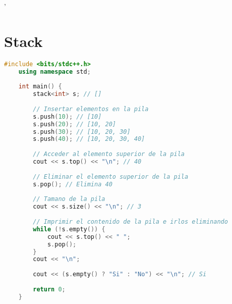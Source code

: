 
'\section*{Stack}

\begin{lstlisting}[language=C++]
	#include <bits/stdc++.h>
	using namespace std;
	
	int main() {
		stack<int> s; // []
		
		// Insertar elementos en la pila
		s.push(10); // [10]
		s.push(20); // [10, 20]
		s.push(30); // [10, 20, 30]
		s.push(40); // [10, 20, 30, 40]
		
		// Acceder al elemento superior de la pila
		cout << s.top() << "\n"; // 40
		
		// Eliminar el elemento superior de la pila
		s.pop(); // Elimina 40
		
		// Tamano de la pila
		cout << s.size() << "\n"; // 3
		
		// Imprimir el contenido de la pila e irlos eliminando 
		while (!s.empty()) {
			cout << s.top() << " "; 
			s.pop(); 
		}
		cout << "\n"; 
		
		cout << (s.empty() ? "Si" : "No") << "\n"; // Si
		
		return 0;
	}

\end{lstlisting}
